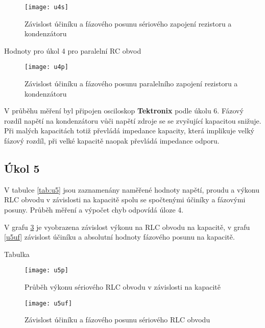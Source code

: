 \documentclass[0-protokol.tex]{subfiles}
\begin{document}
\begin{figure}[H]
\centering
\texttt{[image: u4s]}
\caption{Závislost účiníku a fázového posunu sériového zapojení rezistoru a kondenzátoru}
\label{fig:u4s}
\end{figure}

\begin{table}[H] 
\centering
\setlength{\tabcolsep}{8pt}

\caption{Hodnoty pro úkol 4 pro paralelní RC obvod}
\label{tab:u4p}
\end{table}

\begin{figure}[H]
\centering
\texttt{[image: u4p]}
\caption{Závislost účiníku a fázového posunu paralelního zapojení rezistoru a kondenzátoru}
\label{fig:u4p}
\end{figure}

V průběhu měření byl připojen osciloskop \textbf{Tektronix} podle úkolu 6. Fázový rozdíl napětí na kondenzátoru vůči napětí zdroje se se zvyšující kapacitou snižuje. Při malých kapacitách totiž převládá impedance kapacity, která implikuje velký fázový rozdíl, při velké kapacitě naopak převládá impedance odporu.

\newpage
\subsection*{Úkol 5}
V tabulce \ref{tab:u5} jsou zaznamenány naměřené hodnoty napětí, proudu a výkonu RLC obvodu v závislosti na kapacitě spolu se spočtenými účiníky a fázovými posuny. Průběh měření a výpočet chyb odpovídá úloze 4. 

V grafu \ref{fig:u5p} je  vyobrazena závislost výkonu na RLC obvodu na kapacitě, v grafu \ref{u5uf} závislost účiníku a absolutní hodnoty fázového posunu na kapacitě.

\begin{table}[H] 
\centering
\setlength{\tabcolsep}{8pt}

\caption{Tabulka}
\label{tab:u5}
\end{table}

\begin{figure}[H]
\centering
\texttt{[image: u5p]}
\caption{Průběh výkonu sériového RLC obvodu v závislosti na kapacitě}
\label{fig:u5p}
\end{figure}

\begin{figure}[H]
\centering
\texttt{[image: u5uf]}
\caption{Závislost účiníku a fázového posunu sériového RLC obvodu}
\label{fig:u5uf}
\end{figure}
\end{document}
